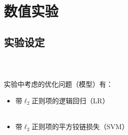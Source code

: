 \section{数值实验}
\subsection{实验设定}

  \frame
  {
    \frametitle{\subsecname~ }
    \footnotesize
    实验中考虑的优化问题（模型）有：
    \begin{itemize}
        \item 带$\ell_2$正则项的逻辑回归（LR）\\~\\
        \item 带$\ell_2$正则项的平方铰链损失（SVM）
    \end{itemize}
  }

